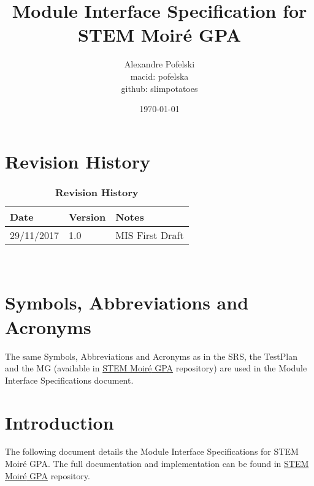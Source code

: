\documentclass[12pt, titlepage]{article}
\newcommand{\progname}{STEM Moir{\'e} GPA}
\begin{document}
\title{Module Interface Specification for \progname{}}

\author{Alexandre Pofelski \\
		macid: pofelska \\
		github: slimpotatoes}

\date{\today}

\maketitle


\section{Revision History}

\begin{table}[h]
\caption{\bf Revision History}
\begin{tabularx}{\textwidth}{p{3cm}p{2cm}X}
\toprule {\bf Date} & {\bf Version} & {\bf Notes}\\
\midrule
29/11/2017 & 1.0 & MIS First Draft\\
\bottomrule
\end{tabularx}
\end{table}

~\newpage

\section{Symbols, Abbreviations and Acronyms}

The same Symbols, Abbreviations and Acronyms as in the SRS, the TestPlan and the 
MG (available in 
\href{https://github.com/slimpotatoes/STEM_Moire_GPA}{\progname{}} repository) 
are used in the Module Interface Specifications document. 

\newpage

\tableofcontents

\newpage


\section{Introduction}

The following document details the Module Interface Specifications for 
\progname{}. The full documentation and implementation can be found in 
\href{https://github.com/slimpotatoes/STEM_Moire_GPA}{\progname{}} repository.
\end{document}
